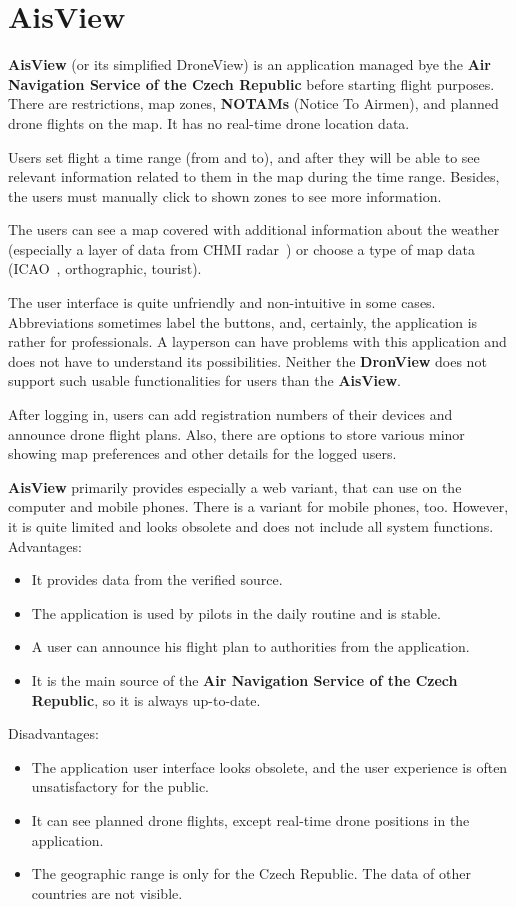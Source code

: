 \section{AisView}\label{sec:aisview}
\textbf{AisView} (or its simplified DroneView) is an application managed bye the \textbf{Air Navigation Service of the Czech Republic} before starting flight purposes.
There are restrictions, map zones, \textbf{NOTAMs} (Notice To Airmen), and planned drone flights on the map.
It has no real-time drone location data.

Users set flight a time range (from and to), and after they will be able to see relevant information related to them in the map during the time range.
Besides, the users must manually click to shown zones to see more information.

The users can see a map covered with additional information about the weather (especially a layer of data from CHMI radar~\cite{chmi}) or choose a type of map data (ICAO~\cite{icao}, orthographic, tourist).

The user interface is quite unfriendly and non-intuitive in some cases.
Abbreviations sometimes label the buttons, and, certainly, the application is rather for professionals.
A layperson can have problems with this application and does not have to understand its possibilities.
Neither the \textbf{DronView} does not support such usable functionalities for users than the \textbf{AisView}.

After logging in, users can add registration numbers of their devices and announce drone flight plans.
Also, there are options to store various minor showing map preferences and other details for the logged users.

\textbf{AisView} primarily provides especially a web variant, that can use on the computer and mobile phones.
There is a variant for mobile phones, too.
However, it is quite limited and looks obsolete and does not include all system functions.
\newline
\newline
Advantages:
\begin{itemize}
    \item It provides data from the verified source.
    \item The application is used by pilots in the daily routine and is stable.
    \item A user can announce his flight plan to authorities from the application.
    \item It is the main source of the \textbf{Air Navigation Service of the Czech Republic}, so it is always up-to-date.
\end{itemize}
Disadvantages:
\begin{itemize}
    \item The application user interface looks obsolete, and the user experience is often unsatisfactory for the public.
    \item It can see planned drone flights, except real-time drone positions in the application.
    \item The geographic range is only for the Czech Republic.
    The data of other countries are not visible.
\end{itemize}
